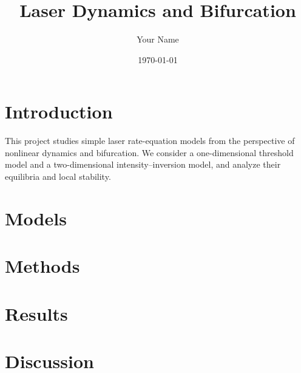 \documentclass[11pt]{article}
\title{Laser Dynamics and Bifurcation}
\author{Your Name}
\date{\today}
\begin{document}
\maketitle

\section{Introduction}
This project studies simple laser rate-equation models from the perspective
of nonlinear dynamics and bifurcation. We consider a one-dimensional threshold
model and a two-dimensional intensity--inversion model, and analyze their
equilibria and local stability.

\section{Models}

\section{Methods}

\section{Results}

\section{Discussion}
\end{document}
